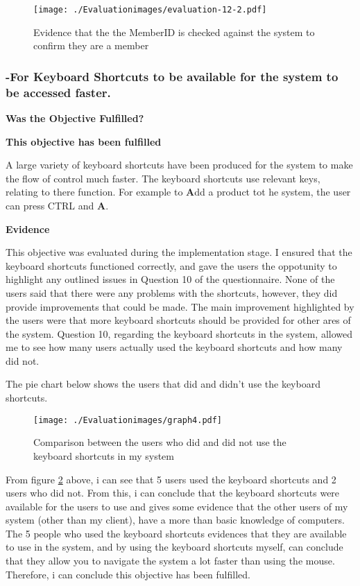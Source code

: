 \begin{figure}[H]
\caption{Evidence that the the MemberID is checked against the system to confirm they are a member} \label{fig:evaluation-12-2}
\hfill\texttt{[image: ./Evaluationimages/evaluation-12-2.pdf]}
\end{figure}






\pagebreak
\subsubsection{-For Keyboard Shortcuts to be available for the system to be accessed faster.}
\textbf{Was the Objective Fulfilled?} \newline

\textbf{\large{This objective has been fulfilled}}

A large variety of keyboard shortcuts have been produced for the system to make the flow of control much faster. The keyboard shortcuts use relevant keys, relating to there function. For example to \textbf{A}dd a product tot he system, the user can press CTRL and \textbf{A}. 

\textbf{Evidence} \newline

This objective was evaluated during the implementation stage. I ensured that the keyboard shortcuts functioned correctly, and gave the users the oppotunity to highlight any outlined issues in Question 10 of the questionnaire. None of the users said that there were any problems with the shortcuts, however, they did provide improvements that could be made. The main improvement highlighted by the users were that more keyboard shortcuts should be provided for other ares of the system. Question 10, regarding the keyboard shortcuts in the system, allowed me to see how many users actually used the keyboard shortcuts and how many did not.

The pie chart below shows the users that did and didn't use the keyboard shortcuts.

\begin{figure}[H]
\caption{Comparison between the users who did and did not use the keyboard shortcuts in my system} \label{graph4}
\hfill\texttt{[image: ./Evaluationimages/graph4.pdf]}
\end{figure}

From figure \ref{graph4} above, i can see that 5 users used the keyboard shortcuts and 2 users who did not. From this, i can conclude that the keyboard shortcuts were available for the users to use and gives some evidence that the other users of my system (other than my client), have a more than basic knowledge of computers. The 5 people who used the keyboard shortcuts evidences that they are available to use in the system, and by using the keyboard shortcuts myself, can conclude that they allow you to navigate the system a lot faster than using the mouse. Therefore, i can conclude this objective has been fulfilled.


